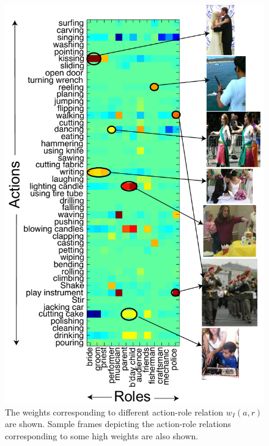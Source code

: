 \documentclass[10pt,twocolumn,letterpaper]{article}
\begin{document}
\vspace*{-3pt}

\begin{figure}[ht!]
\centering
   \includegraphics[scale = 0.48]{../images/ARmat2.pdf}
      \caption{The weights corresponding to different action-role relation $w_I(a,r)$ are shown. Sample frames depicting the action-role relations corresponding to some high weights are also shown.}
\label{fig:action_role_matrix}
\end{figure}
\vspace*{-5pt}
\end{document}
